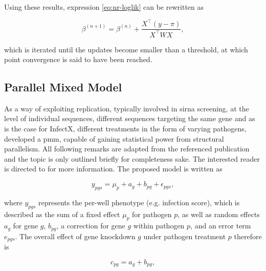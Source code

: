 Using these results, expression \ref{eq:nr-loglik} can be rewritten as

\begin{equation}
  \beta^{(n+1)} = \beta^{(n)} + \frac{X^\intercal (y - \pi)}{X^\intercal W X},
\end{equation}

which is iterated until the updates become smaller than a threshold, at which point convergence is said to have been reached.



\subsection{Parallel Mixed Model}
As a way of exploiting replication, typically involved in \gls{sirna} screening, at the level of individual sequences, different sequences targeting the same gene and as is the case for InfectX, different treatments in the form of varying pathogens, \citeauthor{Ramo2014} developed a \gls{pmm}, capable of gaining statistical power from structural parallelism. All following remarks are adapted from the referenced publication and the topic is only outlined briefly for completeness sake. The interested reader is directed to \cite{Ramo2014} for more information. The proposed model is written as

\begin{equation}
  y_{pgs} = \mu_p + a_g + b_{pg} + \epsilon_{pgs},
\end{equation}

where $y_{pgs}$ represents the per-well phenotype (e.g. infection score), which is described as the sum of a fixed effect $\mu_p$ for pathogen $p$, as well as random effects $a_g$ for gene $g$, $b_{pg}$, a correction for gene $g$ within pathogen $p$, and an error term $e_{pgs}$. The overall effect of gene knockdown $g$ under pathogen treatment $p$ therefore is 



\begin{equation}
  c_{pg} = a_g + b_{pg},
\end{equation}

